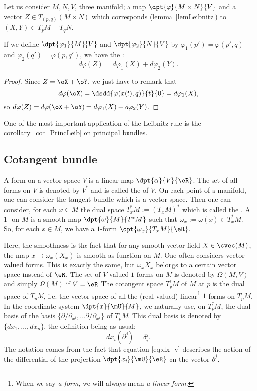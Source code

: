 \begin{proposition} \label{Leibnitz}
Let us consider $M,N,V$, three manifold; a map $\dpt{\varphi}{M\times N}{V}$ and a vector $Z\in T_{(p,q)}(M\times N)$ which corresponds (lemma~\ref{lemLeibnitz}) to $(X,Y)\in T_pM+T_qN$.

If we define $\dpt{\varphi_1}{M}{V}$ and  $\dpt{\varphi_2}{N}{V}$ by $\varphi_1(p')=\varphi(p',q)$ and $\varphi_2(q')=\varphi(p,q')$, we have the :
\begin{equation}
    d\varphi(Z)=d\varphi_1(X)+d\varphi_2(Y).
\end{equation}
\end{proposition}
\begin{proof}
 Since $Z=\oX+\oY$, we just have to remark that
\[
                  d\varphi(\oX)=\dsdd{\varphi(x(t),q)}{t}{0}=d\varphi_1(X),
\]
so $d\varphi(Z)=d\varphi(\oX+\oY)=d\varphi_1(X)+d\varphi_2(Y)$.
\end{proof}
One of the most important application of the Leibnitz rule is the corollary~\ref{cor_PrincLeib} on principal bundles.

\subsection{Cotangent bundle}

A form on a vector space $V$ is a linear map $\dpt{\alpha}{V}{\eR}$. The set of all forms on $V$ is denoted by $V^*$ and is called the  of $V$. On each point of a manifold, one can consider the tangent bundle which is a vector space. Then one can consider, for each $x\in M$ the dual space $T^*_xM:=(T_xM)^*$ which is called the . A $1$- on $M$ is a smooth map $\dpt{\omega}{M}{T^*M}$ such that $\omega_x:=\omega(x)\in T^*_xM$. So, for each $x\in M$, we have a $1$-form $\dpt{\omega_x}{T_xM}{\eR}$.

Here, the smoothness is the fact that for any smooth vector field $X\in\cvec(M)$, the map $x\to\omega_x(X_x)$ is smooth as function on $M$. One often considers vector-valued forms. This is exactly the same, but $\omega_xX_x$ belongs to a certain vector space instead of $\eR$. The set of $V$-valued $1$-forms on $M$ is denoted by $\Omega(M,V)$  and simply $\Omega(M)$ if $V=\eR$
The cotangent space $T^*_pM$ of $M$ at $p$ is the dual space of $T_pM$, i.e. the vector space of all the (real valued) linear\footnote{When we say \emph{a form}, we will always mean \emph{a linear form}.} $1$-forms on $T_pM$. In the coordinate system $\dpt{x}{\mU}{M}$, we naturally use, on $T^*_pM$, the dual basis of the basis $\{\partial/\partial_{x^i},\ldots\partial/\partial_{x^i}\}$ of $T_pM$. This dual basis is denoted by $\{dx_1,\ldots,dx_n\}$, the definition being as usual:
\begin{equation}\label{eq:dx_v}
  dx_i(\partial^j)=\delta^j_i.
\end{equation}
The notation comes from the fact that equation \eqref{eq:dx_v} describes the action of the differential of the projection $\dpt{x_i}{\mU}{\eR}$ on the vector $\partial^j$.

